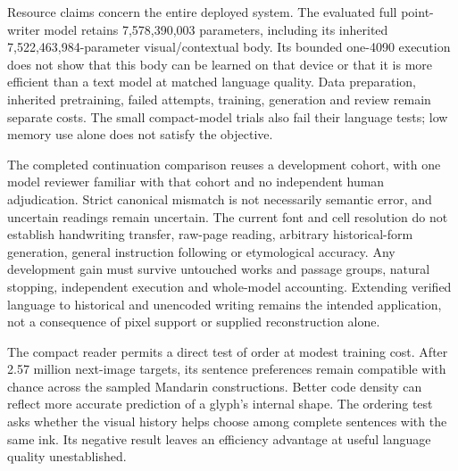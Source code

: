 Resource claims concern the entire deployed system. The evaluated full
point-writer model retains 7,578,390,003 parameters, including its inherited
7,522,463,984-parameter visual/contextual body. Its bounded one-4090 execution
does not show that this body can be learned on that device or that it is more
efficient than a text model at matched language quality. Data preparation,
inherited pretraining, failed attempts, training, generation and review remain
separate costs. The small compact-model trials also fail their language tests;
low memory use alone does not satisfy the objective.

The completed continuation comparison reuses a development cohort, with one
model reviewer familiar with that cohort and no independent human adjudication.
Strict canonical mismatch is not necessarily semantic error, and uncertain
readings remain uncertain. The current font and cell resolution do not establish
handwriting transfer, raw-page reading, arbitrary historical-form generation,
general instruction following or etymological accuracy. Any development gain
must survive untouched works and passage groups, natural stopping, independent
execution and whole-model accounting. Extending verified language to historical
and unencoded writing remains the intended application, not a consequence of
pixel support or supplied reconstruction alone.

The compact reader permits a direct test of order at modest training cost.
After 2.57 million next-image targets, its sentence preferences remain
compatible with chance across the sampled Mandarin constructions. Better
code density can reflect more accurate prediction of a glyph's internal
shape. The ordering test asks whether the visual history helps choose among
complete sentences with the same ink. Its negative result leaves an efficiency
advantage at useful language quality unestablished.
